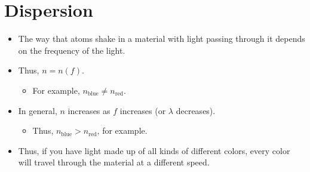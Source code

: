\documentclass[../notes.tex]{subfiles}
\begin{document}
\section{Dispersion}
\begin{itemize}
    \item {}The way that atoms shake in a material with light passing through it depends on the frequency of the light.
    \item Thus, $n=n(f)$.
    \begin{itemize}
        \item For example, $n_\text{blue}\neq n_\text{red}$.
    \end{itemize}
    \item In general, $n$ increases as $f$ increases (or $\lambda$ decreases).
    \begin{itemize}
        \item Thus, $n_\text{blue}>n_\text{red}$, for example.
    \end{itemize}
    \item Thus, if you have light made up of all kinds of different colors, every color will travel through the material at a different speed.
    \begin{figure}[h!]
        \centering
\end{figure}
\end{itemize}
\end{document}
